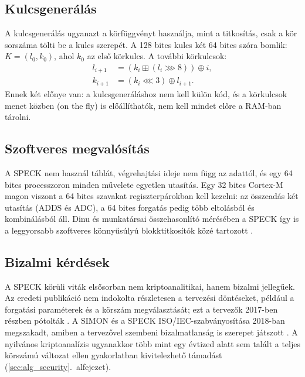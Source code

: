 \documentclass[a4paper,12pt]{report}
\theoremstyle{definition}
\theoremstyle{remark}
\begin{document}
\subsection{Kulcsgenerálás}\label{sec:speck_kulcs}

A kulcsgenerálás ugyanazt a körfüggvényt használja, mint a titkosítás, csak a kör sorszáma tölti be a kulcs szerepét. A 128 bites kulcs két 64 bites szóra bomlik: $K = (l_0, k_0)$, ahol $k_0$ az első körkulcs. A további körkulcsok:
\begin{align}
l_{i+1} &= (k_i \mathbin{\boxplus} (l_i \ggg 8)) \oplus i, \\
k_{i+1} &= (k_i \lll 3) \oplus l_{i+1}.
\end{align}
Ennek két előnye van: a kulcsgeneráláshoz nem kell külön kód, és a körkulcsok menet közben (on the fly) is előállíthatók, nem kell mindet előre a RAM-ban tárolni.

\subsection{Szoftveres megvalósítás}

A SPECK nem használ táblát, végrehajtási ideje nem függ az adattól, és egy 64 bites processzoron minden művelete egyetlen utasítás. Egy 32 bites Cortex-M magon viszont a 64 bites szavakat regiszterpárokban kell kezelni: az összeadás két utasítás (ADDS és ADC), a 64 bites forgatás pedig több eltolásból és kombinálásból áll. Dinu és munkatársai összehasonlító mérésében a SPECK így is a leggyorsabb szoftveres könnyűsúlyú blokktitkosítók közé tartozott \cite{Dinu2015}.

\subsection{Bizalmi kérdések}

A SPECK körüli viták elsősorban nem kriptoanalitikai, hanem bizalmi jellegűek. Az eredeti publikáció nem indokolta részletesen a tervezési döntéseket, például a forgatási paraméterek és a körszám megválasztását; ezt a tervezők 2017-ben részben pótolták \cite{Beaulieu2017}. A SIMON és a SPECK ISO/IEC-szabványosítása 2018-ban megszakadt, amiben a tervezővel szembeni bizalmatlanság is szerepet játszott \cite{Ashur2021}. A nyilvános kriptoanalízis ugyanakkor több mint egy évtized alatt sem talált a teljes körszámú változat ellen gyakorlatban kivitelezhető támadást (\ref{sec:alg_security}.~alfejezet).

\end{document}
